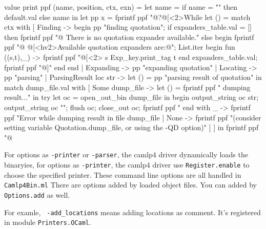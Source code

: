 \begin{ocamlcode}
      value print ppf (name, position, ctx, exn) =
      let name = if name = "" then default.val else name in
      let pp x = fprintf ppf "@?@[<2>While %
      let () =
        match ctx with
        [ Finding -> begin
            pp "finding quotation";
            if expanders_table.val = [] then
              fprintf ppf "@ There is no quotation expander available."
            else
              begin
                fprintf ppf "@ @[<hv2>Available quotation expanders are:@\n";
                List.iter begin fun ((s,t),_) ->
                  fprintf ppf "@[<2>%
                    s Exp_key.print_tag t
                end expanders_table.val;
                fprintf ppf "@]"
              end
          end
        | Expanding -> pp "expanding quotation"
        | Locating -> pp "parsing"
        | ParsingResult loc str ->
          let () = pp "parsing result of quotation" in
          match dump_file.val with
          [ Some dump_file ->
              let () = fprintf ppf " dumping result...\n" in
              try
                let oc = open_out_bin dump_file in
                begin
                  output_string oc str;
                  output_string oc "\n";
                  flush oc;
                  close_out oc;
                  fprintf ppf "%
                end
              with _ ->
                fprintf ppf
                  "Error while dumping result in file %
                  dump_file
          | None ->
              fprintf ppf
                "\n(consider setting variable Quotation.dump_file, or using the -QD option)"
          ]
        ]
      in fprintf ppf "@\n%
\end{ocamlcode}

For options as \verb|-printer| or \verb|-parser|, the camlp4 driver
dynamically loads the binaryies, for options as \verb|-printer|, the
camlp4 driver use \verb|Register.enable| to choose the specified
printer.  These command line options are all handled in
\verb|Camlp4Bin.ml| There are options added by loaded object
files. You can added by \verb|Options.add| as well.

For examle, \verb| -add_locations| means adding locations as
comment.  It's registered in module \verb|Printers.OCaml|.

